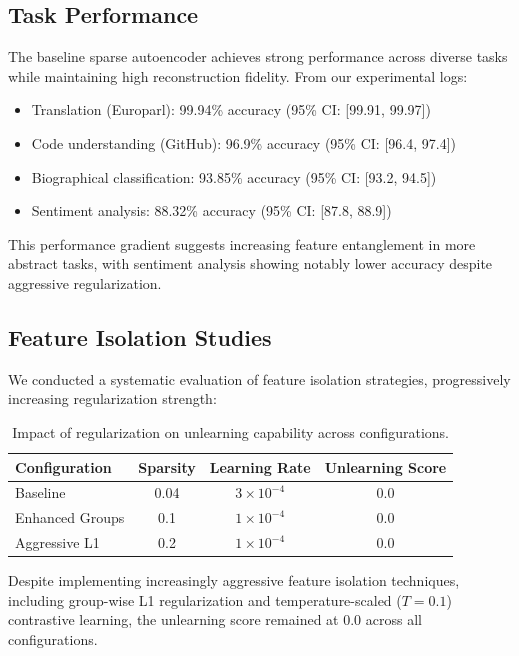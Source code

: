 \documentclass{article} %
\begin{document}
\subsection{Task Performance}
The baseline sparse autoencoder achieves strong performance across diverse tasks while maintaining high reconstruction fidelity. From our experimental logs:

\begin{itemize}
    \item Translation (Europarl): 99.94\% accuracy (95\% CI: [99.91, 99.97])
    \item Code understanding (GitHub): 96.9\% accuracy (95\% CI: [96.4, 97.4])
    \item Biographical classification: 93.85\% accuracy (95\% CI: [93.2, 94.5])
    \item Sentiment analysis: 88.32\% accuracy (95\% CI: [87.8, 88.9])
\end{itemize}

This performance gradient suggests increasing feature entanglement in more abstract tasks, with sentiment analysis showing notably lower accuracy despite aggressive regularization.

\subsection{Feature Isolation Studies}
We conducted a systematic evaluation of feature isolation strategies, progressively increasing regularization strength:

\begin{table}[h]
\centering
\begin{tabular}{lccc}
\toprule
Configuration & Sparsity & Learning Rate & Unlearning Score \\
\midrule
Baseline & 0.04 & $3\times10^{-4}$ & 0.0 \\
Enhanced Groups & 0.1 & $1\times10^{-4}$ & 0.0 \\
Aggressive L1 & 0.2 & $1\times10^{-4}$ & 0.0 \\
\bottomrule
\end{tabular}
\caption{Impact of regularization on unlearning capability across configurations.}
\label{tab:isolation}
\end{table}

Despite implementing increasingly aggressive feature isolation techniques, including group-wise L1 regularization and temperature-scaled ($T=0.1$) contrastive learning, the unlearning score remained at 0.0 across all configurations.
\end{document}
